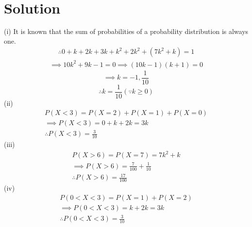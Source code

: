 \documentclass[journal,12pt,twocolumn]{IEEEtran}
\begin{document}
\section*{Solution}
(i)
It is known that the sum of probabilities of a probability distribution is always one.
\begin{align}
\tag{5.12.1}
    \therefore 0 + k + 2k + 3k + k^2 + 2k^2 + (7k^2 + k) = 1 
\end{align}
\begin{align}
\tag{5.12.2}
\implies 10k^2 + 9k - 1 = 0 
 \implies  (10k - 1)(k + 1) = 0 
 \end{align}
  \begin{equation}
  \tag{5.12.3}
 \implies  k = -1, \frac{1}{10} 
\end{equation}
\begin{equation}
    \tag{1}
 \therefore k = \frac{1}{10} (\because k \ge 0)
 \end{equation}
(ii)
\begin{align}
\tag{5.12.4}
P(X < 3) = P(X = 2) + P(X = 1) + P(X = 0) \\
\tag{5.12.5}
\implies  P(X < 3) = 0 + k + 2k = 3k \\
\tag{2}
\therefore  P(X < 3) = \frac{3}{10} 
   \end{align}
(iii)
\begin{align}
\tag{5.12.6}
P( X > 6) = P(X = 7) = 7k^2 + k \\
\tag{5.12.7}
\implies  P(X > 6)  = \frac{7}{100} + \frac{1}{10} \\
\tag{3}
\therefore P(X > 6) = \frac{17}{100} 
\end{align}
(iv) 
\begin{align}
\tag{5.12.8}
 P(0 < X < 3) = P(X = 1) + P(X = 2)  \\
 \tag{5.12.9}
              \implies   P(0 < X < 3) = k + 2k = 3k\\
\tag{4}              
    \therefore    P(0 < X < 3) = \frac{3}{10}
\end{align}
\end{document}
